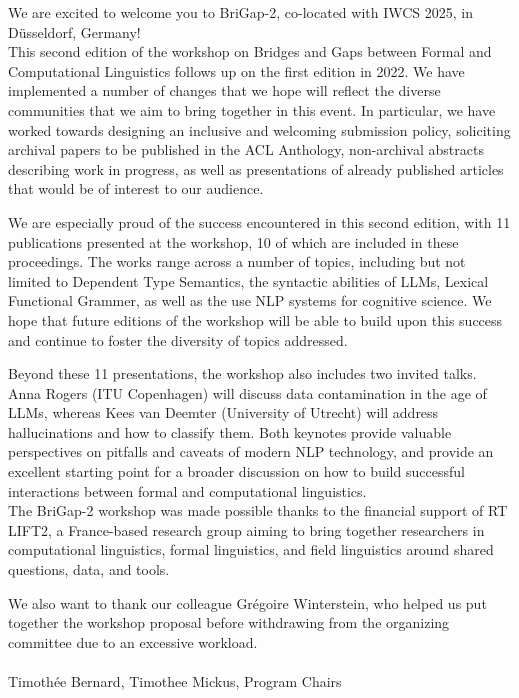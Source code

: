 We are excited to welcome you to BriGap-2, co-located with IWCS 2025, in Düsseldorf, Germany!\\

This second edition of the workshop on Bridges and Gaps between Formal and Computational Linguistics follows up on the first edition in 2022.
We have implemented a number of changes that we hope will reflect the diverse communities that we aim to bring together in this event.
In particular, we have worked towards designing an inclusive and welcoming submission policy, soliciting archival papers to be published in the ACL Anthology, non-archival abstracts describing work in progress, as well as presentations of already published articles that would be of interest to our audience.

We are especially proud of the success encountered in this second edition, with 11 publications presented at the workshop, 10 of which are included in these proceedings.
The works range across a number of topics, including but not limited to Dependent Type Semantics, the syntactic abilities of LLMs, Lexical Functional Grammer, as well as the use NLP systems for cognitive science.
We hope that future editions of the workshop will be able to build upon this success and continue to foster the diversity of topics addressed.

Beyond these 11 presentations, the workshop also includes two invited talks. 
Anna Rogers (ITU Copenhagen) will discuss data contamination in the age of LLMs, whereas Kees van Deemter (University of Utrecht) will address hallucinations and how to classify them.
Both keynotes provide valuable perspectives on pitfalls and caveats of modern NLP technology, and provide an excellent starting point for a broader discussion on how to build successful interactions between formal and computational linguistics.\\

The BriGap-2 workshop was made possible thanks to the financial support of RT LIFT2, a France-based research group aiming to bring together researchers in computational linguistics, formal linguistics, and field linguistics around shared questions, data, and tools.

We also want to thank our colleague Grégoire Winterstein, who helped us put together the workshop proposal before withdrawing from the organizing committee due to an excessive workload.\\\\

Timothée Bernard, Timothee Mickus, Program Chairs
